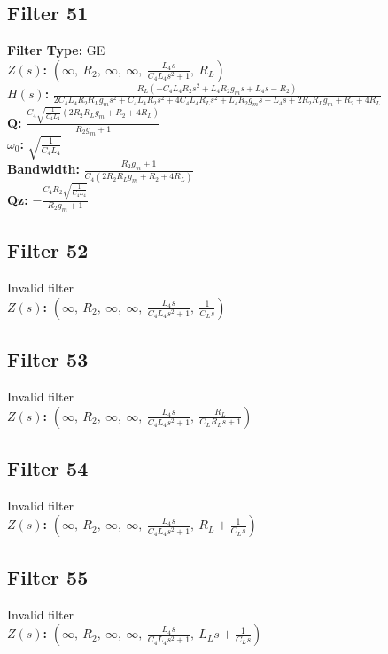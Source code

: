 \documentclass{article}
\begin{document}
\subsection*{Filter 51}
\textbf{Filter Type:} GE \\ 
\textbf{$Z(s)$:} $\left( \infty, \  R_{2}, \  \infty, \  \infty, \  \frac{L_{4} s}{C_{4} L_{4} s^{2} + 1}, \  R_{L}\right)$ \\ 
\textbf{$H(s)$:} $\frac{R_{L} \left(- C_{4} L_{4} R_{2} s^{2} + L_{4} R_{2} g_{m} s + L_{4} s - R_{2}\right)}{2 C_{4} L_{4} R_{2} R_{L} g_{m} s^{2} + C_{4} L_{4} R_{2} s^{2} + 4 C_{4} L_{4} R_{L} s^{2} + L_{4} R_{2} g_{m} s + L_{4} s + 2 R_{2} R_{L} g_{m} + R_{2} + 4 R_{L}}$ \\ 
\textbf{Q:} $\frac{C_{4} \sqrt{\frac{1}{C_{4} L_{4}}} \left(2 R_{2} R_{L} g_{m} + R_{2} + 4 R_{L}\right)}{R_{2} g_{m} + 1}$ \\ 
\textbf{$\omega_0$:} $\sqrt{\frac{1}{C_{4} L_{4}}}$ \\ 
\textbf{Bandwidth:} $\frac{R_{2} g_{m} + 1}{C_{4} \left(2 R_{2} R_{L} g_{m} + R_{2} + 4 R_{L}\right)}$ \\ 
\textbf{Qz:} $- \frac{C_{4} R_{2} \sqrt{\frac{1}{C_{4} L_{4}}}}{R_{2} g_{m} + 1}$ \\ 
\subsection*{Filter 52}
Invalid filter \\ 
\textbf{$Z(s)$:} $\left( \infty, \  R_{2}, \  \infty, \  \infty, \  \frac{L_{4} s}{C_{4} L_{4} s^{2} + 1}, \  \frac{1}{C_{L} s}\right)$ \\ 
\subsection*{Filter 53}
Invalid filter \\ 
\textbf{$Z(s)$:} $\left( \infty, \  R_{2}, \  \infty, \  \infty, \  \frac{L_{4} s}{C_{4} L_{4} s^{2} + 1}, \  \frac{R_{L}}{C_{L} R_{L} s + 1}\right)$ \\ 
\subsection*{Filter 54}
Invalid filter \\ 
\textbf{$Z(s)$:} $\left( \infty, \  R_{2}, \  \infty, \  \infty, \  \frac{L_{4} s}{C_{4} L_{4} s^{2} + 1}, \  R_{L} + \frac{1}{C_{L} s}\right)$ \\ 
\subsection*{Filter 55}
Invalid filter \\ 
\textbf{$Z(s)$:} $\left( \infty, \  R_{2}, \  \infty, \  \infty, \  \frac{L_{4} s}{C_{4} L_{4} s^{2} + 1}, \  L_{L} s + \frac{1}{C_{L} s}\right)$ \\ 
\end{document}
